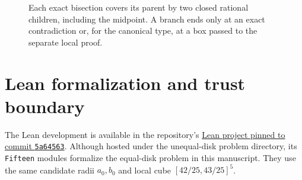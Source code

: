 \documentclass[11pt]{article}
\theoremstyle{definition}
\begin{document}
\begin{figure}[htbp]
\centering
{}
\caption{Each exact bisection covers its parent by two closed rational children, including the midpoint. A branch ends only at an exact contradiction or, for the canonical type, at a box passed to the separate local proof.}
\label{fig:branch-tree}
\end{figure}

\section{Lean formalization and trust boundary}\label{sec:lean-status}

The Lean development is available in the repository's
\href{https://github.com/ziifave/unequal-circle-proof/tree/5a64563/problems/packing-disks-radii-sqrt1-to-sqrt10-in-a-circle/lean}{Lean project pinned to commit \texttt{5a64563}}.
Although hosted under the unequal-disk problem directory, its \texttt{Fifteen}
modules formalize the equal-disk problem in this manuscript. They use the same
candidate radii $a_0,b_0$ and local cube $[42/25,43/25]^5$.
\end{document}

